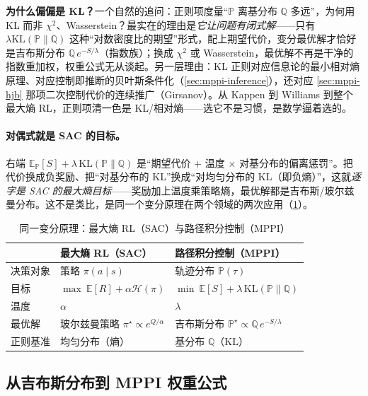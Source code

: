 \begin{note}
\textbf{为什么偏偏是 KL？}\;一个自然的追问：正则项度量“$\mathbb{P}$ 离基分布 $\mathbb{Q}$ 多远”，为何用 KL 而非 $\chi^2$、Wasserstein？最实在的理由是\emph{它让问题有闭式解}——只有 $\lambda\mathrm{KL}(\mathbb{P}\|\mathbb{Q})$ 这种“对数密度比的期望”形式，配上期望代价，变分最优解才恰好是吉布斯分布 $\mathbb{Q}\,e^{-S/\lambda}$（指数族）；换成 $\chi^2$ 或 Wasserstein，最优解不再是干净的指数重加权，权重公式无从谈起。另一层理由：KL 正则对应信息论的最小相对熵原理、对应控制即推断的贝叶斯条件化（\cref{sec:mppi-inference}），还对应 \cref{sec:mppi-hjb} 那项二次控制代价的连续推广（Girsanov）。从 Kappen 到 Williams 到整个最大熵 RL，正则项清一色是 KL/相对熵——选它不是习惯，是数学逼着选的。
\end{note}

\paragraph{对偶式就是 SAC 的目标。}右端 $\mathbb{E}_{\mathbb{P}}[S]+\lambda\,\mathrm{KL}(\mathbb{P}\|\mathbb{Q})$ 是“期望代价 + 温度 $\times$ 对基分布的偏离惩罚”。把代价换成负奖励、把“对基分布的 KL”换成“对均匀分布的 KL（即负熵）”，这就\emph{逐字是 SAC 的最大熵目标}\cite{haarnoja2018soft}——奖励加上温度乘策略熵，最优解都是吉布斯/玻尔兹曼分布。这不是类比，是同一个变分原理在两个领域的两次应用（\cref{tab:mppi-sac}）。

\begin{table}[H]\centering\small
\caption{同一变分原理：最大熵 RL（SAC）与路径积分控制（MPPI）}
\label{tab:mppi-sac}
\begin{tabular}{lll}
\toprule
 & 最大熵 RL（SAC） & 路径积分控制（MPPI） \\
\midrule
决策对象 & 策略 $\pi(a\mid s)$ & 轨迹分布 $\mathbb{P}(\tau)$ \\
目标 & $\max\ \mathbb{E}[R]+\alpha\mathcal{H}(\pi)$ & $\min\ \mathbb{E}[S]+\lambda\,\mathrm{KL}(\mathbb{P}\|\mathbb{Q})$ \\
温度 & $\alpha$ & $\lambda$ \\
最优解 & 玻尔兹曼策略 $\pi^\star\propto e^{Q/\alpha}$ & 吉布斯分布 $\mathbb{P}^\star\propto\mathbb{Q}\,e^{-S/\lambda}$ \\
正则基准 & 均匀分布（熵） & 基分布 $\mathbb{Q}$（KL） \\
\bottomrule
\end{tabular}
\end{table}

\subsection{从吉布斯分布到 MPPI 权重公式}
\label{sec:mppi-weights}

